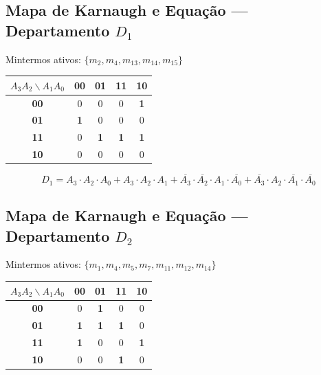 \documentclass[11pt,a4paper]{article}
\begin{document}
\subsection{\texorpdfstring{Mapa de Karnaugh e Equação --- Departamento $D_1$}{Mapa D1}}
Mintermos ativos: $\{m_2, m_4, m_{13}, m_{14}, m_{15}\}$

\begin{table}[h!]
\centering
\begin{tabular}{|c|c|c|c|c|}
\hline
\rowcolor{secondary} \textbf{$A_3 A_2 \backslash A_1 A_0$} & \textbf{00} & \textbf{01} & \textbf{11} & \textbf{10} \\ \hline
\textbf{00} & 0 & 0 & 0 & \textbf{\textcolor{accent}{1}} \\ \hline
\textbf{01} & \textbf{\textcolor{accent}{1}} & 0 & 0 & 0 \\ \hline
\textbf{11} & 0 & \textbf{\textcolor{accent}{1}} & \textbf{\textcolor{accent}{1}} & \textbf{\textcolor{accent}{1}} \\ \hline
\textbf{10} & 0 & 0 & 0 & 0 \\ \hline
\end{tabular}
\end{table}

\begin{equation}
D_1 = A_3 \cdot A_2 \cdot A_0 + A_3 \cdot A_2 \cdot A_1 + \overline{A_3} \cdot \overline{A_2} \cdot A_1 \cdot \overline{A_0} + \overline{A_3} \cdot A_2 \cdot \overline{A_1} \cdot \overline{A_0}
\end{equation}

\subsection{\texorpdfstring{Mapa de Karnaugh e Equação --- Departamento $D_2$}{Mapa D2}}
Mintermos ativos: $\{m_1, m_4, m_5, m_7, m_{11}, m_{12}, m_{14}\}$

\begin{table}[h!]
\centering
\begin{tabular}{|c|c|c|c|c|}
\hline
\rowcolor{secondary} \textbf{$A_3 A_2 \backslash A_1 A_0$} & \textbf{00} & \textbf{01} & \textbf{11} & \textbf{10} \\ \hline
\textbf{00} & 0 & \textbf{\textcolor{accent}{1}} & 0 & 0 \\ \hline
\textbf{01} & \textbf{\textcolor{accent}{1}} & \textbf{\textcolor{accent}{1}} & \textbf{\textcolor{accent}{1}} & 0 \\ \hline
\textbf{11} & \textbf{\textcolor{accent}{1}} & 0 & 0 & \textbf{\textcolor{accent}{1}} \\ \hline
\textbf{10} & 0 & 0 & \textbf{\textcolor{accent}{1}} & 0 \\ \hline
\end{tabular}
\end{table}
\end{document}
